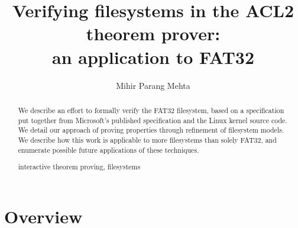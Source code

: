 \documentclass[runningheads,a4paper]{llncs}
\newcommand{\keywords}[1]{\par\addvspace\baselineskip
\noindent\keywordname\enspace\ignorespaces#1}
\begin{document}
\mainmatter  %

\title{Verifying filesystems in the ACL2 theorem prover:\\ an
  application to FAT32}


%
%
\author{Mihir Parang Mehta}
%


%
%

\maketitle

\begin{abstract}
  We describe an effort to formally verify the FAT32 filesystem, based
  on a specification put together from Microsoft's published
  specification and the Linux kernel source code. We detail our
  approach of proving properties through refinement of filesystem
  models. We describe how this work is applicable to more filesystems
  than solely FAT32, and enumerate possible future applications of
  these techniques.
\keywords{interactive theorem proving, filesystems}
\end{abstract}

\section{Overview}
\end{document}
